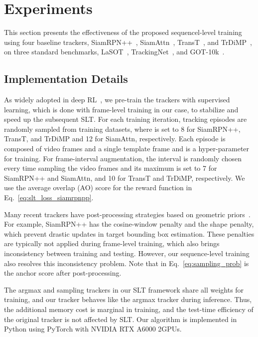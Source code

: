 

\section{Experiments}\label{sec:experiments}
This section presents the effectiveness of the proposed sequencel-level training using four baseline trackers, SiamRPN++~\cite{siamrpnpp}, SiamAttn~\cite{siamattn}, TransT~\cite{transt}, and TrDiMP~\cite{trdimp}, 
on three standard benchmarks, LaSOT~\cite{lasot}, TrackingNet~\cite{trackingnet}, and GOT-10k~\cite{got10k}.


\subsection{Implementation Details}
As widely adopted in deep RL~\cite{deepqlearning,scst,adnet}, we pre-train the trackers with supervised learning, which is done with frame-level training in our case, to stabilize and speed up the subsequent SLT. 
For each training iteration,  tracking episodes are randomly sampled from training datasets, where  is set to 8 for SiamRPN++, TransT, and TrDiMP and 12 for SiamAttn, respectively.
Each episode is composed of  video frames and a single template frame and  is a hyper-parameter for training.
For frame-interval augmentation, the interval is randomly chosen every time sampling the video frames and its maximum is set to 7 for SiamRPN++ and SiamAttn, and 10 for TransT and TrDiMP, respectively.
We use the average overlap (AO) score for the reward function  in Eq.~\ref{eq:slt_loss_siamrpnpp}.



Many recent trackers have post-processing strategies based on geometric priors~\cite{siamrpnpp,siamattn,dimp,trdimp,transt}.
For example, SiamRPN++ has the cosine-window penalty and the shape penalty, which prevent drastic updates in target bounding box estimation.
These penalties are typically not applied during frame-level training, which also brings inconsistency between training and testing.
However, our sequence-level training also resolves this inconsistency problem. 
Note that  in Eq.~\ref{eq:sampling_prob} is the anchor score after post-processing.


The argmax and sampling trackers in our SLT framework share all weights for training, and our tracker behaves like the argmax tracker during inference.
Thus, the additional memory cost is marginal in training, and the test-time efficiency of the original tracker is not affected by SLT.
Our algorithm is implemented in Python using PyTorch with NVIDIA RTX A6000 2GPUs.


